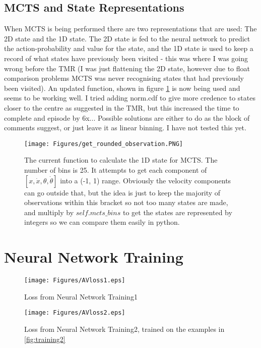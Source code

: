 \documentclass[11.7pt]{article}
\begin{document}
\subsection{MCTS and State Representations}

When MCTS is being performed there are two representations that are used: The 2D state and the 1D state. The 2D state is fed to the neural network to predict the action-probability and value for the state, and the 1D state is used to keep a record of what states have previously been visited - this was where I was going wrong before the TMR (I was just flattening the 2D state, however due to float comparison problems MCTS was never recognising states that had previously been visited). An updated function, shown in figure \ref{fig:1Dstate} is now being used and seems to be working well. I tried adding norm.cdf to give more credence to states closer to the centre as suggested in the TMR, but this increased the time to complete and episode by 6x... Possible solutions are either to do as the block of comments suggest, or just leave it as linear binning. I have not tested this yet. 

\begin{figure}[h]
   \centering
   \texttt{[image: Figures/get\_rounded\_observation.PNG]}
   \caption{The current function to calculate the 1D state for MCTS. The number of bins is 25. It attempts to get each component of $[x, \dot{x}, \theta, \dot{\theta}]$ into a (-1, 1) range. Obviously the velocity components can go outside that, but the idea is just to keep the majority of observations within this bracket so not too many states are made, and multiply by $self.mcts\_bins$ to get the states are represented by integers so we can compare them easily in python.}
   \label{fig:1Dstate}
\end{figure}

\section{Neural Network Training}

\begin{figure}[ht]
   \begin{minipage}[b]{0.48\linewidth}
      \centering
      \texttt{[image: Figures/AVloss1.eps]}
      \caption{Loss from Neural Network Training1}
      \label{fig:loss1}
   \end{minipage}
   \hspace{0.2cm}
   \begin{minipage}[b]{0.48\linewidth}
      \centering
      \texttt{[image: Figures/AVloss2.eps]}
      \caption{Loss from Neural Network Training2, trained on the examples in \ref{fig:training2}}
      \label{fig:loss2}
   \end{minipage}
\end{figure}
\end{document}
